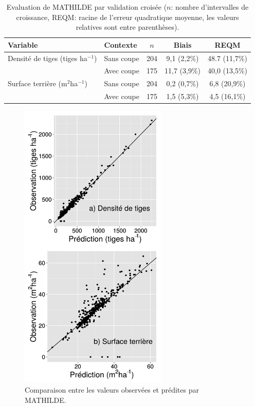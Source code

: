 \documentclass[a4paper,12pt]{article}
\begin{document}
\begin{table}[!h]
\begin{center}
\caption{Evaluation de MATHILDE par validation croisée ($n$: nombre d'intervalles de croissance, REQM: racine de l'erreur quadratique moyenne, les valeurs relatives sont entre parenthèses).}
\label{TableEvaluationLERFoB}
\begin{tabular}{llccc}
\hline
Variable & Contexte & $n$ & Biais & REQM \\
\hline
Densité de tiges (tiges ha$^{-1}$) & Sans coupe & 204 & 9,1 (2,2\%) & 48.7 (11,7\%) \\
				& Avec coupe & 175 & 11,7 (3,9\%) & 40,0 (13,5\%) \\
Surface terrière (m$^2$ha$^{-1}$) & Sans coupe & 204 & 0,2 (0,7\%) & 6,8 (20,9\%) \\
 				& Avec coupe & 175 & 1,5 (5,3\%) & 4,5 (16,1\%) \\
 \hline
\end{tabular}
\end{center}
\end{table}

\begin{figure}[!h]
\begin{center}
\includegraphics[width=7cm]{./figures/stochasticEvaluationGraphfr}
\caption{Comparaison entre les valeurs observées et prédites par MATHILDE.}
\label{figureComparObsPred}
\end{center}
\end{figure}
\end{document}
